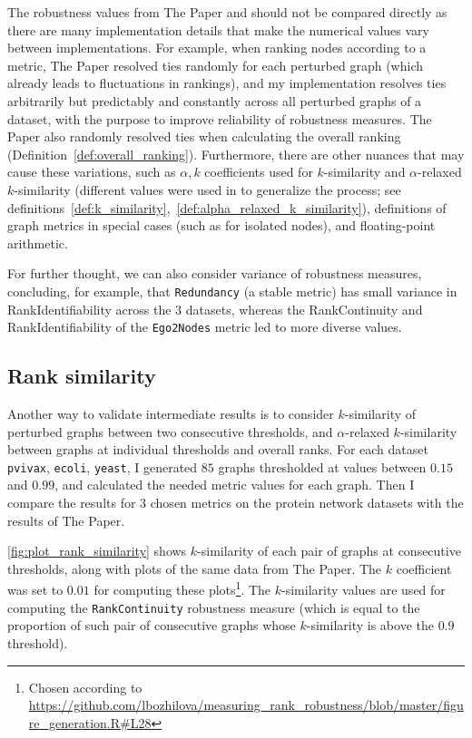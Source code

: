 The robustness values from The Paper and \graffs should not be compared directly as there are many implementation details that make the numerical values vary between implementations.
For example, when ranking nodes according to a metric, The Paper resolved ties randomly for each perturbed graph (which already leads to fluctuations in rankings), and my implementation resolves ties arbitrarily but predictably and constantly across all perturbed graphs of a dataset, with the purpose to improve reliability of robustness measures.
The Paper also randomly resolved ties when calculating the overall ranking (Definition~\ref{def:overall_ranking}).
Furthermore, there are other nuances that may cause these variations, such as $\alpha,k$ coefficients used for $k$-similarity and $\alpha$-relaxed $k$-similarity (different values were used in \graffs to generalize the process; see definitions~\ref{def:k_similarity},~\ref{def:alpha_relaxed_k_similarity}), definitions of graph metrics in special cases (such as for isolated nodes), and floating-point arithmetic.

For further thought, we can also consider variance of robustness measures, concluding, for example, that \texttt{Redundancy} (a stable metric) has small variance in RankIdentifiability across the 3 datasets, whereas the RankContinuity and RankIdentifiability of the \texttt{Ego2Nodes} metric led to more diverse values.

\subsection{Rank similarity}

Another way to validate intermediate results is to consider $k$-similarity of perturbed graphs between two consecutive thresholds, and $\alpha$-relaxed $k$-similarity between graphs at individual thresholds and overall ranks.
For each dataset \texttt{pvivax}, \texttt{ecoli}, \texttt{yeast}, I generated $85$ graphs thresholded at values between $0.15$ and $0.99$, and calculated the needed metric values for each graph.
Then I compare the results for 3 chosen metrics on the protein network datasets with the results of The Paper.




\autoref{fig:plot_rank_similarity} shows $k$-similarity of each pair of graphs at consecutive thresholds, along with plots of the same data from The Paper.
The $k$ coefficient was set to $0.01$ for computing these plots\footnote{Chosen according to \url{https://github.com/lbozhilova/measuring_rank_robustness/blob/master/figure_generation.R#L28}}.
The $k$-similarity values are used for computing the \texttt{RankContinuity} robustness measure (which is equal to the proportion of such pair of consecutive graphs whose $k$-similarity is above the $0.9$ threshold).

